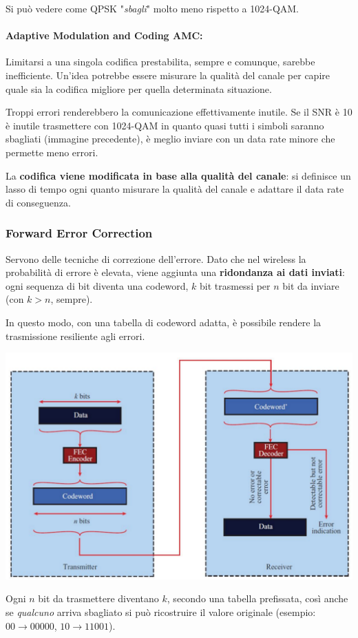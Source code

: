 Si può vedere come QPSK "\textit{sbagli}" molto meno rispetto a 1024-QAM.

\paragraph{Adaptive Modulation and Coding AMC:} Limitarsi a una singola codifica prestabilita, sempre e comunque, sarebbe inefficiente. Un'idea potrebbe essere misurare la qualità del canale per capire quale sia la codifica migliore per quella determinata situazione. 

Troppi errori renderebbero la comunicazione effettivamente inutile. Se il SNR è 10 è inutile trasmettere con 1024-QAM in quanto quasi tutti i simboli saranno sbagliati (immagine precedente), è meglio inviare con un data rate minore che permette meno errori. 

La \textbf{codifica viene modificata in base alla qualità del canale}: si definisce un lasso di tempo ogni quanto misurare la qualità del canale e adattare il data rate di conseguenza.

\subsubsection{Forward Error Correction}

Servono delle tecniche di correzione dell'errore. Dato che nel wireless la probabilità di errore è elevata, viene aggiunta una \textbf{ridondanza ai dati inviati}: ogni sequenza di bit diventa una codeword, $k$ bit trasmessi per $n$ bit da inviare (con $k>n$, sempre). 

In questo modo, con una tabella di codeword adatta, è possibile rendere la trasmissione resiliente agli errori.
\begin{center}
	\includegraphics[width=0.7\linewidth]{img/wireless/FEC1}
\end{center}

Ogni $n$ bit da trasmettere diventano $k$, secondo una tabella prefissata, così anche se \textit{qualcuno} arriva sbagliato si può ricostruire il valore originale (esempio: $00 \rightarrow 00000$, $10 \rightarrow 11001$).


